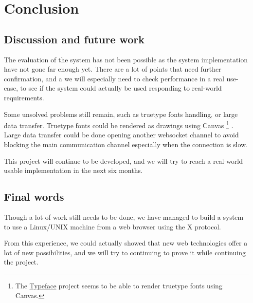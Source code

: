 \chapter{Conclusion}
\section{Discussion and future work}
The evaluation of the system has not been possible as the system implementation have not gone far enough yet.
There are a lot of points that need further confirmation, and a we will
especially need to check performance in a real use-case, to see 
if the system could actually be used responding to real-world requirements.

Some unsolved problems still remain, such as truetype fonts handling, 
or large data transfer. Truetype fonts could be rendered as drawings using 
Canvas
\footnote{The \href{http://typeface.neocracy.org/}{Typeface} project seems to be able to render truetype fonts using Canvas.}
. Large data transfer could be done opening another websocket channel 
to avoid blocking the main communication channel especially when the 
connection is slow.

This project will continue to be developed, and we will try to reach 
a real-world usable implementation in the next six months.
\section{Final words}
Though a lot of work still needs to be done, we have managed to 
build a system to use a Linux/UNIX machine from a web browser 
using the X protocol. 

From this experience, we could actually showed that new web technologies 
offer a lot of new possibilities, and we will try to continuing to prove it 
while continuing the project.
